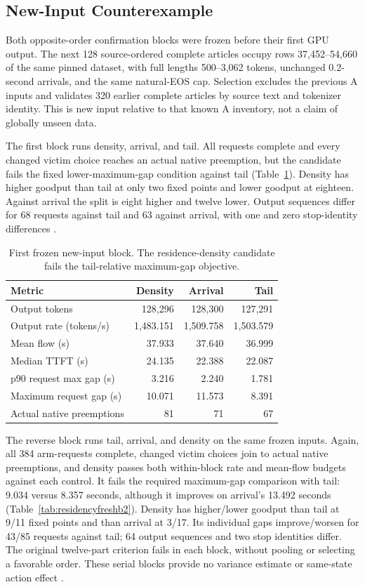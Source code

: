 \documentclass[10pt]{article}
\begin{document}
\subsection{New-Input Counterexample}
Both opposite-order confirmation blocks were frozen before their first GPU output. The next 128 source-ordered complete articles occupy rows 37,452--54,660 of the same pinned dataset, with full lengths 500--3,062 tokens, unchanged 0.2-second arrivals, and the same natural-EOS cap. Selection excludes the previous A inputs and validates 320 earlier complete articles by source text and tokenizer identity. This is new input relative to that known A inventory, not a claim of globally unseen data.

The first block runs density, arrival, and tail. All requests complete and every changed victim choice reaches an actual native preemption, but the candidate fails the fixed lower-maximum-gap condition against tail (Table~\ref{tab:residencyfresh}). Density has higher goodput than tail at only two fixed points and lower goodput at eighteen. Against arrival the split is eight higher and twelve lower. Output sequences differ for 68 requests against tail and 63 against arrival, with one and zero stop-identity differences \cite{residencyfreshb1}.

\begin{table}[t]
\centering\small
\caption{First frozen new-input block. The residence-density candidate fails the tail-relative maximum-gap objective.}
\label{tab:residencyfresh}
\begin{tabular}{lrrr}
\toprule
Metric & Density & Arrival & Tail \\
\midrule
Output tokens & 128,296 & 128,300 & 127,291 \\
Output rate (tokens/s) & 1,483.151 & 1,509.758 & 1,503.579 \\
Mean flow (s) & 37.933 & 37.640 & 36.999 \\
Median TTFT (s) & 24.135 & 22.388 & 22.087 \\
p90 request max gap (s) & 3.216 & 2.240 & 1.781 \\
Maximum request gap (s) & 10.071 & 11.573 & 8.391 \\
Actual native preemptions & 81 & 71 & 67 \\
\bottomrule
\end{tabular}
\end{table}

The reverse block runs tail, arrival, and density on the same frozen inputs. Again, all 384 arm-requests complete, changed victim choices join to actual native preemptions, and density passes both within-block rate and mean-flow budgets against each control. It fails the required maximum-gap comparison with tail: 9.034 versus 8.357 seconds, although it improves on arrival's 13.492 seconds (Table~\ref{tab:residencyfreshb2}). Density has higher/lower goodput than tail at 9/11 fixed points and than arrival at 3/17. Its individual gaps improve/worsen for 43/85 requests against tail; 64 output sequences and two stop identities differ. The original twelve-part criterion fails in each block, without pooling or selecting a favorable order. These serial blocks provide no variance estimate or same-state action effect \cite{residencyfreshb2,residencyfreshtwo}.
\end{document}
